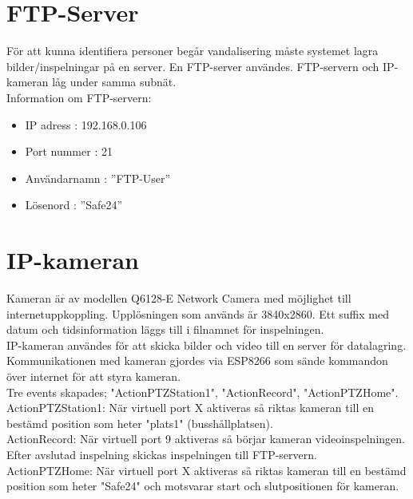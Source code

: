\section{FTP-Server}
För att kunna identifiera personer begår vandalisering måste systemet lagra bilder/inspelningar på en server. En FTP-server användes. FTP-servern och IP-kameran låg under samma subnät.\\

Information om FTP-servern:

\begin{itemize}
\item IP adress : 192.168.0.106

\item Port nummer : 21

\item Användarnamn : ”FTP-User”

\item Lösenord : ”Safe24”

\end{itemize}
\section{IP-kameran}
Kameran är av modellen Q6128-E Network Camera med möjlighet till internetuppkoppling. Upplösningen som används är 3840x2860. Ett suffix med datum och tidsinformation läggs till i filnamnet för inspelningen.\\

IP-kameran användes för att skicka bilder och video till en server för datalagring.\\

Kommunikationen med kameran gjordes via ESP8266 som sände kommandon över internet för att styra kameran.\\

Tre events skapades; "ActionPTZStation1", "ActionRecord", "ActionPTZHome".\\

ActionPTZStation1: När virtuell port X aktiveras så riktas kameran till en bestämd position som heter "plats1" (busshållplatsen).\\

ActionRecord: När virtuell port 9 aktiveras så börjar kameran videoinspelningen. Efter avslutad inspelning skickas inspelningen till FTP-servern. \\

ActionPTZHome: När virtuell port X aktiveras så riktas kameran till en bestämd position som heter "Safe24" och motsvarar start och slutpositionen för kameran.\\

